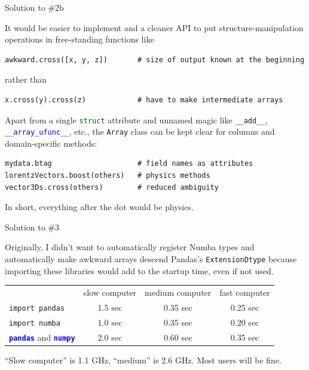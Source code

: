 \documentclass[aspectratio=169]{beamer}
\begin{document}
\begin{frame}[fragile]{Solution to \#2b}
\large
\vspace{0.5 cm}

It would be easier to implement and a cleaner API to put structure-manipulation operations in free-standing functions like

\small
\begin{verbatim}
awkward.cross([x, y, z])       # size of output known at the beginning
\end{verbatim}

\large
rather than

\small
\begin{verbatim}
x.cross(y).cross(z)            # have to make intermediate arrays
\end{verbatim}

\large
\vspace{0.25 cm}
Apart from a single \textcolor{darkgreen}{\texttt{struct}} attribute and unnamed magic like \texttt{__add__}, \textcolor{blue}{\texttt{__array_ufunc__}}, etc., the {\tt Array} class can be kept clear for columns and domain-specific methods:

\small
\begin{verbatim}
mydata.btag                    # field names as attributes
lorentzVectors.boost(others)   # physics methods
vector3Ds.cross(others)        # reduced ambiguity
\end{verbatim}

\large
In short, everything after the dot would be physics.
\end{frame}

\begin{frame}{Solution to \#3}
\large
\vspace{0.5 cm}

Originally, I didn't want to automatically register Numba types and automatically make awkward arrays descend Pandas's {\tt ExtensionDtype} because importing these libraries would add to the startup time, even if not used.

\begin{center}
\renewcommand{\arraystretch}{1.5}
\begin{tabular}{l c c c}
& slow computer & medium computer & fast computer \\
\texttt{import pandas} & 1.5 sec & 0.35 sec & 0.25 sec \\
\texttt{import numba} & 1.0 sec & 0.35 sec & 0.20 sec \\
\textcolor{blue}{\texttt{\textbf{pandas}}} and \textcolor{blue}{\texttt{\textbf{numpy}}} & 2.0 sec & 0.60 sec & 0.35 sec \\
\end{tabular}
\end{center}

\vspace{0.5 cm}
``Slow computer'' is 1.1 GHz, ``medium'' is 2.6 GHz. Most users will be fine.
\end{frame}
\end{document}
